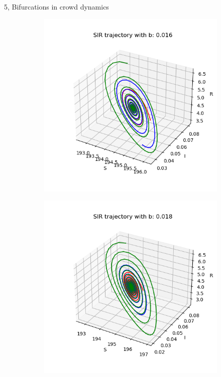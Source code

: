 \documentclass[10pt,a4paper]{article}
\begin{document}
\begin{task}{5, Bifurcations in crowd dynamics }
\begin{figure} [H]
\begin{subfigure} {0.33\textwidth}
\end{subfigure}
\begin{subfigure} {0.33\textwidth}
    \centering
    \label{task5-3-3}
    \includegraphics[width=.9\linewidth]{images/0.016.png} 
\end{subfigure}
\medskip
\begin{subfigure} {0.33\textwidth}
    \centering
    \label{task5-3-4}
    \includegraphics[width=.9\linewidth]{images/0.018.png} 

\end{subfigure}
\end{figure}
\end{task}
\end{document}
